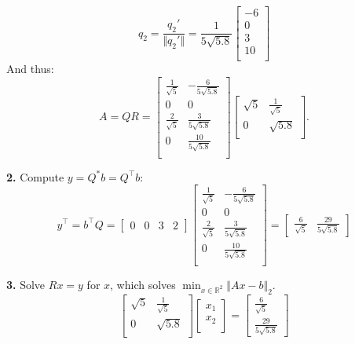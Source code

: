 \documentclass[a4paper, 11pt]{article}
\begin{document}
\begin{equation*}
  q_2 = \frac{q_2'}{\Vert q_2'\Vert} = \frac{1}{5\sqrt{5.8}}
  \begin{bmatrix}
  -6  \\
  0 \\
  3 \\
  10 \\
  \end{bmatrix}
\end{equation*}
And thus:
\begin{equation*}
  A = QR =
  \begin{bmatrix}
  \frac{1}{\sqrt{5}} & -\frac{6}{5\sqrt{5.8}} \\
  0 & 0 \\
  \frac{2}{\sqrt{5}} & \frac{3}{5\sqrt{5.8}} \\
  0 & \frac{10}{5\sqrt{5.8}} \\
  \end{bmatrix}
  \begin{bmatrix}
  \sqrt{5} & \frac{1}{\sqrt{5}} \\
  0 & \sqrt{5.8} \\
  \end{bmatrix}.
\end{equation*}

\textbf{2.} Compute $y = Q^*b = Q^\top b$:
\begin{equation*}
  y^\top = b^\top Q =
  \begin{bmatrix}
    0 & 0 & 3 & 2
  \end{bmatrix}
  \begin{bmatrix}
  \frac{1}{\sqrt{5}} & -\frac{6}{5\sqrt{5.8}} \\
  0 & 0 \\
  \frac{2}{\sqrt{5}} & \frac{3}{5\sqrt{5.8}} \\
  0 & \frac{10}{5\sqrt{5.8}} \\
  \end{bmatrix}
  =
  \begin{bmatrix}
    \frac{6}{\sqrt{5}} & \frac{29}{5\sqrt{5.8}}
  \end{bmatrix}
\end{equation*}

\textbf{3.} Solve $Rx=y$ for $x$, which solves $\min_{x \in \mathbb{R}^2} \Vert
Ax - b\Vert_2$.
\begin{equation*}
  \begin{bmatrix}
  \sqrt{5} & \frac{1}{\sqrt{5}} \\
  0 & \sqrt{5.8} \\
  \end{bmatrix}
  \begin{bmatrix}
    x_1 \\
    x_2 \\
  \end{bmatrix}
  =
  \begin{bmatrix}
    \frac{6}{\sqrt{5}} \\
    \frac{29}{5\sqrt{5.8}}
  \end{bmatrix}
\end{equation*}
\end{document}
